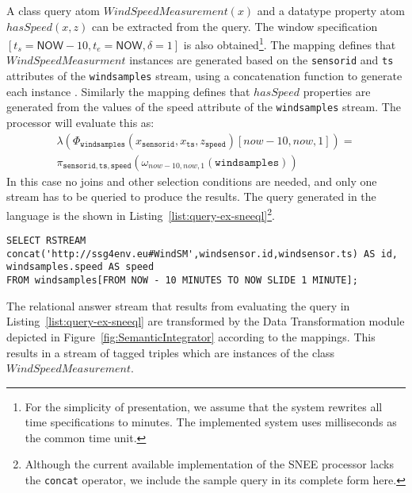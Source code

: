A class query atom $WindSpeedMeasurement(x)$ and a datatype property atom $hasSpeed(x,z)$ can be extracted from the \sparqlstr query. 
The window specification $[t_s=\textsf{NOW}-10,t_e=\textsf{NOW},\delta=1]$ is also obtained\footnote{For the simplicity of presentation, we assume that the system rewrites all time specifications to minutes.
The implemented system uses milliseconds as the common time unit.}.
The \stwoo mapping defines that $WindSpeedMeasurment$ instances are generated based on the \texttt{sensorid} and \texttt{ts} attributes of the \texttt{windsamples} stream, using a concatenation function to generate each instance \uri.
Similarly the \stwoo mapping defines that $hasSpeed$ properties are generated from the values of the speed attribute of the \texttt{windsamples} stream. 
The processor will evaluate this as:
\begin{align*}
\lambda(\Phi_{\mathtt{windsamples}}(x_{\mathtt{sensorid}},x_{\mathtt{ts}},z_{\mathtt{speed}})[now-10,now,1]) = \\ \pi_{\mathtt{sensorid,ts,speed}}(\omega_{now-10,now,1} (\mathtt{windsamples}))
\end{align*}
In this case no joins and other selection conditions are needed, and only one stream has to be queried to produce the results. 
The query generated in the \sneeql language is the shown in Listing~\ref{list:query-ex-sneeql}\footnote {Although the current available implementation of the SNEE processor lacks the \texttt{concat} operator, we include the sample query in its complete form here.}.

\begin{lstlisting}[style=SNEEqlStyle,language=SNEEql,frame=none,float,label=list:query-ex-sneeql,caption=The \sneeql query that is generated for the input query in Listing~\ref{list:query-example}.]
SELECT RSTREAM concat('http://ssg4env.eu#WindSM',windsensor.id,windsensor.ts) AS id, windsamples.speed AS speed
FROM windsamples[FROM NOW - 10 MINUTES TO NOW SLIDE 1 MINUTE];
\end{lstlisting}



The relational answer stream that results from evaluating the query in Listing~\ref{list:query-ex-sneeql} are transformed by the \textsf{Data Transformation} module depicted in Figure~\ref{fig:SemanticIntegrator} according to the \stwoo mappings.
This results in a stream of tagged triples which are instances of the class $WindSpeedMeasurement$.


